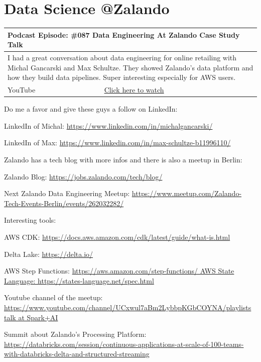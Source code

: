 \documentclass[12pt, numbers=noenddot]{scrreprt} %
\begin{document}
\section{Data Science @Zalando}

\begin{table}[h]
\begin{tabular}{ll}
\hline
\multicolumn{2}{l}{\textbf{Podcast Episode:} \#087 Data Engineering At Zalando Case Study Talk} \\ \hline
\multicolumn{2}{p{15cm}}{I had a great conversation about data engineering for online retailing with Michal Gancarski and Max Schultze. They showed Zalando's data platform and how they build data pipelines.
Super interesting especially for AWS users. }         \\ \hline
\multicolumn{1}{l|}{YouTube}   & \href{https://youtu.be/IXOLsNA6Hm0}{Click here to watch}   \\  \hline
\end{tabular}
 \label{tbl:087Zalando}
\end{table}

Do me a favor and give these guys a follow on LinkedIn:

LinkedIn of Michal: \url{https://www.linkedin.com/in/michalgancarski/}

LinkedIn of Max: \url{https://www.linkedin.com/in/max-schultze-b11996110/}

Zalando has a tech blog with more infos and there is also a meetup in Berlin:

Zalando Blog:
\url{https://jobs.zalando.com/tech/blog/}

Next Zalando Data Engineering Meetup:
\url{https://www.meetup.com/Zalando-Tech-Events-Berlin/events/262032282/}

Interesting tools:

AWS CDK:
\url{https://docs.aws.amazon.com/cdk/latest/guide/what-is.html}

Delta Lake:
\url{https://delta.io/}

AWS Step Functions:
\url{https://aws.amazon.com/step-functions/ AWS State Language: https://states-language.net/spec.html}

Youtube channel of the meetup:
\url{https://www.youtube.com/channel/UCxwul7aBm2LybbpKGbCOYNA/playlists talk at Spark+AI}

Summit about Zalando's Processing Platform:
\url{https://databricks.com/session/continuous-applications-at-scale-of-100-teams-with-databricks-delta-and-structured-streaming}
\end{document}
